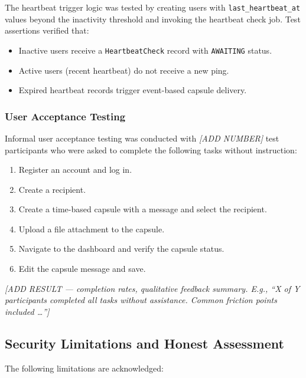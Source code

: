 \documentclass[12pt, a4paper]{article}
\begin{document}
The heartbeat trigger logic was tested by creating users with \texttt{last\_heartbeat\_at} values beyond the inactivity threshold and invoking the heartbeat check job. Test assertions verified that:

\begin{itemize}
  \item Inactive users receive a \texttt{HeartbeatCheck} record with \texttt{AWAITING} status.
  \item Active users (recent heartbeat) do not receive a new ping.
  \item Expired heartbeat records trigger event-based capsule delivery.
\end{itemize}

\subsubsection{User Acceptance Testing}

Informal user acceptance testing was conducted with \textit{[ADD NUMBER]} test participants who were asked to complete the following tasks without instruction:

\begin{enumerate}
  \item Register an account and log in.
  \item Create a recipient.
  \item Create a time-based capsule with a message and select the recipient.
  \item Upload a file attachment to the capsule.
  \item Navigate to the dashboard and verify the capsule status.
  \item Edit the capsule message and save.
\end{enumerate}

\textit{[ADD RESULT — completion rates, qualitative feedback summary. E.g., ``X of Y participants completed all tasks without assistance. Common friction points included \ldots'']}

\subsection{Security Limitations and Honest Assessment}

The following limitations are acknowledged:
\end{document}
